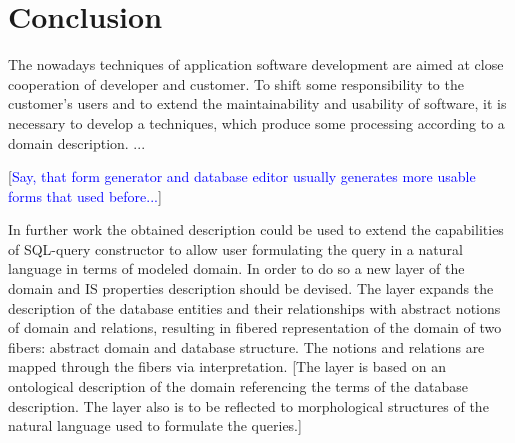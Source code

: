 \documentclass[conference]{IEEEtran}
\newcommand{\e}[2][fcolor]{\textcolor{pcolor}{[}\textcolor{#1}{#2}\textcolor{pcolor}{]}}
\begin{document}
%




\section{Conclusion}

The nowadays techniques of application software development are aimed at close cooperation of developer and customer.  To shift some responsibility to the customer's users and to extend the maintainability and usability of software, it is necessary to develop a techniques, which produce some processing according to a domain description.  ...

\e[blue]{Say, that form generator and database editor usually generates more usable forms that used before...}

In further work the obtained description could be used to extend the capabilities of SQL-query constructor to allow user formulating the query in a natural language in terms of modeled domain.  In order to do so a new layer of the domain and IS properties description should be devised.  The layer expands the description of the database entities and their relationships with abstract notions of domain and relations, resulting in fibered representation of the domain of two fibers: abstract domain and database structure.  The notions and relations are mapped through the fibers via interpretation.  \e{The layer is based on an ontological description of the domain referencing the terms of the database description.  The layer also is to be reflected to morphological structures of the natural language used to formulate the queries.}
\end{document}
